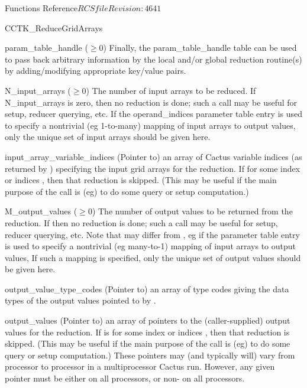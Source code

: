 \begin{cactuspart}{ Functions Reference}{$RCSfile$}{$Revision: 4641 $}
\begin{FunctionDescription}{CCTK\_ReduceGridArrays}
\begin{ParameterSection}
\begin{Parameter}{param\_table\_handle ($\ge 0$)}
Finally, the  param\_table\_handle  table can be used to pass back arbitrary
information by the local and/or global reduction routine(s) by
adding/modifying appropriate key/value pairs.
\end{Parameter}
\begin{Parameter}{N\_input\_arrays ($\ge 0$)}
The number of input arrays to be reduced.  If  N\_input\_arrays is zero,
then no reduction is done; such a call may be useful for setup,
reducer querying, etc.  If the  operand\_indices  parameter table
entry is used to specify a nontrivial (eg 1-to-many) mapping of input
arrays to output values, only the unique set of input arrays should
be given here.
\end{Parameter}
\begin{Parameter}{input\_array\_variable\_indices}
(Pointer to) an array of    Cactus variable indices
(as returned by   ) specifying the input grid arrays
for the reduction.  If  \newline {}
for some index or indices   , then that reduction is skipped.
(This may be useful if the main purpose of the call is (eg) to do
some query or setup computation.)
\end{Parameter}
\begin{Parameter}{M\_output\_values ($\ge 0$)}
The number of output values to be returned from the reduction.
If   then no reduction is done; such a call
may be useful for setup, reducer querying, etc.  Note that
  may differ from   , eg if the
  parameter table entry is used to specify a
nontrivial (eg many-to-1) mapping of input arrays to output values,
If such a mapping is specified, only the unique set of output values
should be given here.
\end{Parameter}
\begin{Parameter}{output\_value\_type\_codes}
(Pointer to) an array of     type
codes giving the data types of the output values pointed to by
.
\end{Parameter}
\begin{Parameter}{output\_values}
(Pointer to) an array of    pointers to the
(caller-supplied) output values for the reduction.
If   is  for some index or indices   ,
then that reduction is skipped.  (This may be useful if the main
purpose of the call is (eg) to do some query or setup computation.)
These pointers may (and typically will) vary from processor to
processor in a multiprocessor Cactus run.  However, any given pointer
must be either  on all processors, or non- on all processors.
\end{Parameter}
\end{ParameterSection}


\end{FunctionDescription}
\end{cactuspart}
